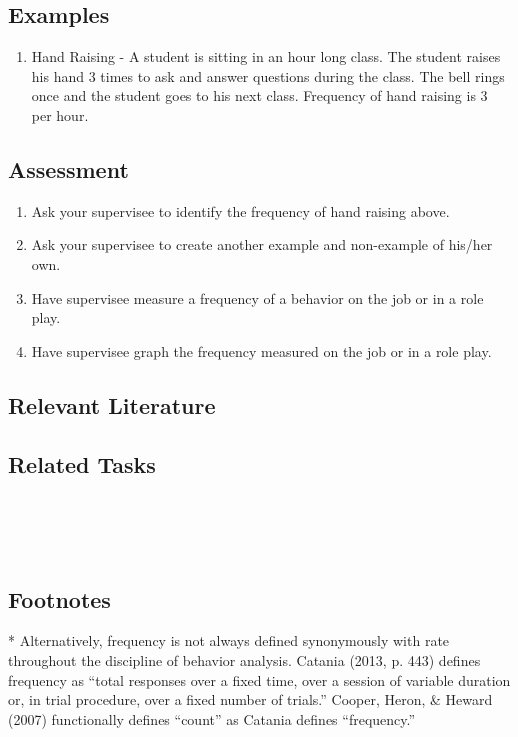 \subsection{Examples}
\begin{enumerate}
\item Hand Raising - A student is sitting in an hour long class. The student raises his hand 3 times to ask and answer questions during the class. The bell rings once and the student goes to his next class. Frequency of hand raising is 3 per hour.
\end{enumerate}
% 
\subsection{Assessment} 
\begin{enumerate}
\item Ask your supervisee to identify the frequency of hand raising above.
\item Ask your supervisee to create another example and non-example of his/her own.
\item Have supervisee measure a frequency of a behavior on the job or in a role play.
\item Have supervisee graph the frequency measured on the job or in a role play.
\end{enumerate}
%
\subsection{Relevant Literature}
\begin{refsection}
\nocite{catania2013learning,cooper2007applied}
\printbibliography[heading=none]
\end{refsection}

\subsection{Related Tasks} 
\fouriOne{}\\
\fourhOne{}\\
\fourFKFourtySeven{}\\
%
\subsection{Footnotes}
* Alternatively, frequency is not always defined synonymously with rate throughout the discipline of behavior analysis. Catania (2013, p. 443) defines frequency as ``total responses over a fixed time, over a session of variable duration or, in trial procedure, over a fixed number of trials.'' Cooper, Heron, \& Heward (2007) functionally defines ``count'' as Catania defines ``frequency.''
%
%
%
%
%
%
%
%
%
%
%
%
%
